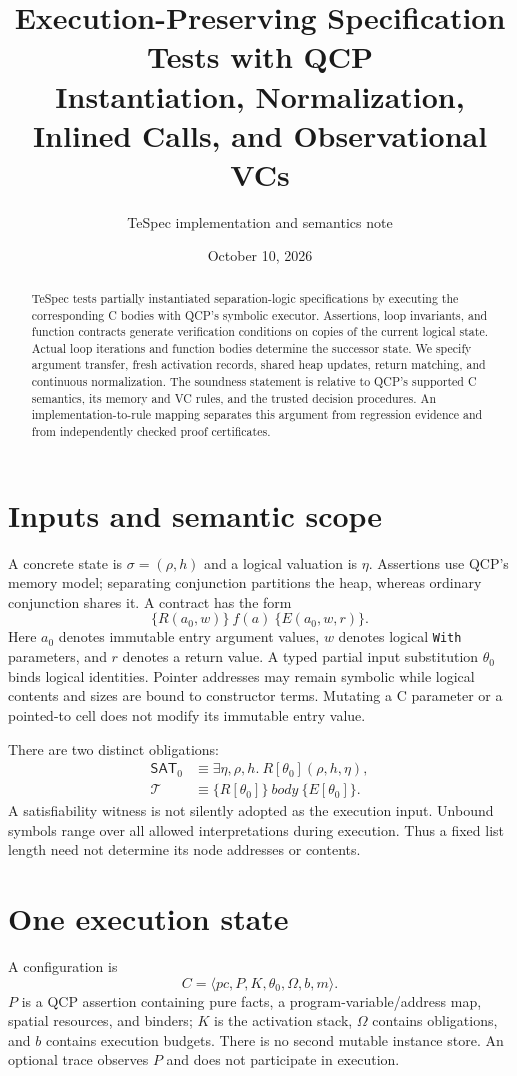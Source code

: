 \documentclass[10pt]{article}
\title{Execution-Preserving Specification Tests with QCP\\
\large Instantiation, Normalization, Inlined Calls, and Observational VCs}
\author{TeSpec implementation and semantics note}
\date{October 10, 2026}
\newcommand{\SAT}{\mathsf{SAT}}
\begin{document}
\maketitle
\begin{abstract}
TeSpec tests partially instantiated separation-logic specifications by
executing the corresponding C bodies with QCP's symbolic executor.
Assertions, loop invariants, and function contracts generate verification
conditions on copies of the current logical state. Actual loop iterations
and function bodies determine the successor state. We specify argument
transfer, fresh activation records, shared heap updates, return matching,
and continuous normalization. The soundness statement is relative to QCP's
supported C semantics, its memory and VC rules, and the trusted decision
procedures. An implementation-to-rule mapping separates this argument from
regression evidence and from independently checked proof certificates.
\end{abstract}

\section{Inputs and semantic scope}
A concrete state is $\sigma=(\rho,h)$ and a logical valuation is $\eta$.
Assertions use QCP's memory model; separating conjunction partitions the
heap, whereas ordinary conjunction shares it. A contract has the form
\[
 \{R(a_0,w)\}\ f(a)\ \{E(a_0,w,r)\}.
\]
Here $a_0$ denotes immutable entry argument values, $w$ denotes logical
\texttt{With} parameters, and $r$ denotes a return value.
A typed partial input substitution $\theta_0$ binds logical identities.
Pointer addresses may remain symbolic while logical contents and sizes are
bound to constructor terms. Mutating a C parameter or a pointed-to cell does
not modify its immutable entry value.

There are two distinct obligations:
\begin{align*}
 \SAT_0 &\equiv \exists\eta,\rho,h.\ R[\theta_0](\rho,h,\eta),\\
 \mathcal{T} &\equiv \{R[\theta_0]\}\ \mathit{body}\ \{E[\theta_0]\}.
\end{align*}
A satisfiability witness is not silently adopted as the execution input.
Unbound symbols range over all allowed interpretations during execution.
Thus a fixed list length need not determine its node addresses or contents.

\section{One execution state}
A configuration is
\[
 C=\langle pc,P,K,\theta_0,\Omega,b,m\rangle.
\]
$P$ is a QCP assertion containing pure facts, a program-variable/address map,
spatial resources, and binders; $K$ is the activation stack, $\Omega$ contains
obligations, and $b$ contains execution budgets. There is no second mutable
instance store. An optional trace observes $P$ and does not participate in
execution.
\end{document}
